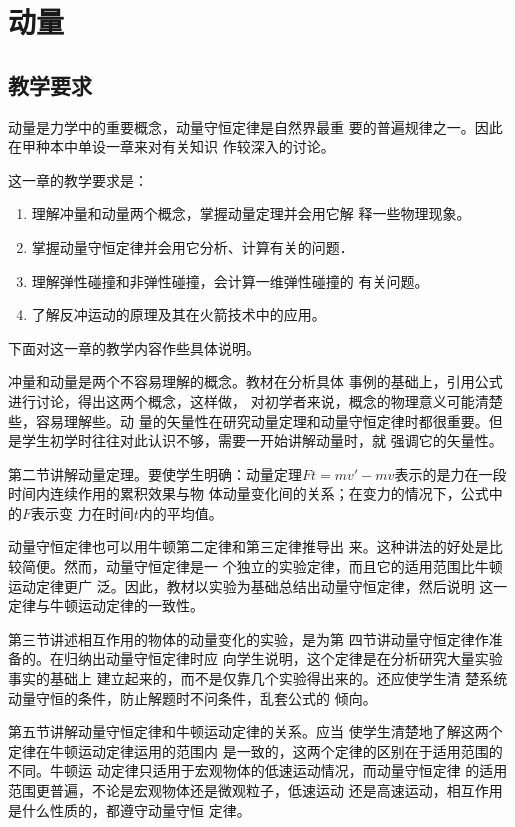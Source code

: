 \chapter{动量}

\section{教学要求}

动量是力学中的重要概念，动量守恒定律是自然界最重
要的普遍规律之一。因此在甲种本中单设一章来对有关知识
作较深入的讨论。

这一章的教学要求是：
\begin{enumerate}
\item 理解冲量和动量两个概念，掌握动量定理并会用它解
释一些物理现象。
\item 掌握动量守恒定律并会用它分析、计算有关的问题．
\item 理解弹性碰撞和非弹性碰撞，会计算一维弹性碰撞的
有关问题。
\item 了解反冲运动的原理及其在火箭技术中的应用。
\end{enumerate}

下面对这一章的教学内容作些具体说明。

冲量和动量是两个不容易理解的概念。教材在分析具体
事例的基础上，引用公式进行讨论，得出这两个概念，这样做，
对初学者来说，概念的物理意义可能清楚些，容易理解些。动
量的矢量性在研究动量定理和动量守恒定律时都很重要。但
是学生初学时往往对此认识不够，需要一开始讲解动量时，就
强调它的矢量性。

第二节讲解动量定理。要使学生明确：动量定理$Ft=
mv'-mv$表示的是力在一段时间内连续作用的累积效果与物
体动量变化间的关系；在变力的情况下，公式中的$F$表示变
力在时间$t$内的平均值。

动量守恒定律也可以用牛顿第二定律和第三定律推导出
来。这种讲法的好处是比较简便。然而，动量守恒定律是一
个独立的实验定律，而且它的适用范围比牛顿运动定律更广
泛。因此，教材以实验为基础总结出动量守恒定律，然后说明
这一定律与牛顿运动定律的一致性。

第三节讲述相互作用的物体的动量变化的实验，是为第
四节讲动量守恒定律作准备的。在归纳出动量守恒定律时应
向学生说明，这个定律是在分析研究大量实验事实的基础上
建立起来的，而不是仅靠几个实验得出来的。还应使学生清
楚系统动量守恒的条件，防止解题时不问条件，乱套公式的
倾向。

第五节讲解动量守恒定律和牛顿运动定律的关系。应当
使学生清楚地了解这两个定律在牛顿运动定律运用的范围内
是一致的，这两个定律的区别在于适用范围的不同。牛顿运
动定律只适用于宏观物体的低速运动情况，而动量守恒定律
的适用范围更普遍，不论是宏观物体还是微观粒子，低速运动
还是高速运动，相互作用是什么性质的，都遵守动量守恒
定律。

